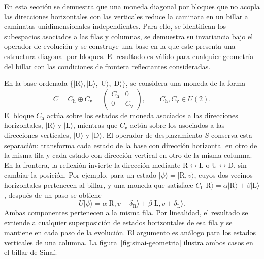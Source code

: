 \documentclass[12pt,a4paper,oneside]{report} %
\begin{document}
%
En esta sección se demuestra que una moneda diagonal por bloques que no acopla las direcciones horizontales con las verticales reduce la caminata en un billar a caminatas unidimensionales independientes. Para ello, se identifican los subespacios asociados a las filas y columnas, se demuestra su invariancia bajo el operador de evolución y se construye una base en la que este presenta una estructura diagonal por bloques. El resultado es válido para cualquier geometría del billar con las condiciones de frontera reflectantes consideradas.

En la base ordenada $\{|\mathrm{R}\rangle,|\mathrm{L}\rangle,|\mathrm{U}\rangle,|\mathrm{D}\rangle\}$, se considera una moneda de la forma
\begin{equation}
  C=C_{\mathrm{h}}\oplus C_{\mathrm{v}}
  =\begin{pmatrix}
    C_{\mathrm{h}} & 0\\
    0 & C_{\mathrm{v}}
  \end{pmatrix},
  \qquad C_{\mathrm{h}},C_{\mathrm{v}}\in U(2).
  \label{eq:moneda-diagonal-bloques}
\end{equation}
El bloque $C_{\mathrm{h}}$ actúa sobre los estados de moneda asociados a las direcciones horizontales, $|\mathrm{R}\rangle$ y $|\mathrm{L}\rangle$, mientras que $C_{\mathrm{v}}$ actúa sobre los asociados a las direcciones verticales, $|\mathrm{U}\rangle$ y $|\mathrm{D}\rangle$. El operador de desplazamiento $S$ conserva esta separación: transforma cada estado de la base con dirección horizontal en otro de la misma fila y cada estado con dirección vertical en otro de la misma columna. En la frontera, la reflexión invierte la dirección mediante $\mathrm{R}\leftrightarrow \mathrm{L}$ o $\mathrm{U}\leftrightarrow \mathrm{D}$, sin cambiar la posición. Por ejemplo, para un estado $|\psi\rangle=|\mathrm{R},v\rangle$, cuyos dos vecinos horizontales pertenecen al billar, y una moneda que satisface $C_{\mathrm{h}}|\mathrm{R}\rangle=\alpha|\mathrm{R}\rangle+\beta|\mathrm{L}\rangle$, después de un paso se obtiene
\begin{equation}
  U|\psi\rangle
  =\alpha|\mathrm{R},v+\delta_{\mathrm{R}}\rangle
  +\beta|\mathrm{L},v+\delta_{\mathrm{L}}\rangle.
  \label{eq:subspace}
\end{equation}
Ambas componentes pertenecen a la misma fila. Por linealidad, el resultado se extiende a cualquier superposición de estados horizontales de esa fila y se mantiene en cada paso de la evolución. El argumento es análogo para los estados verticales de una columna. La figura~\ref{fig:sinai-geometria} ilustra ambos casos en el billar de Sinaí.
\end{document}
